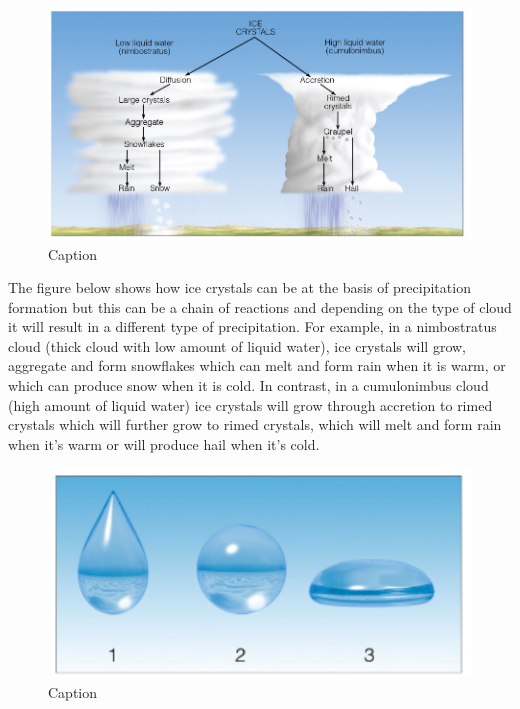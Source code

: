 \documentclass[12pt,oneside]{book}
\begin{document}
\begin{figure}

{\centering \includegraphics[width=0.9\linewidth]{figures/Figure334} 

}

\caption{Caption}\label{fig:Seeding}
\end{figure}

The figure below shows how ice crystals can be at the basis of
precipitation formation but this can be a chain of reactions and
depending on the type of cloud it will result in a different type of
precipitation. For example, in a nimbostratus cloud (thick cloud with
low amount of liquid water), ice crystals will grow, aggregate and form
snowflakes which can melt and form rain when it is warm, or which can
produce snow when it is cold. In contrast, in a cumulonimbus cloud (high
amount of liquid water) ice crystals will grow through accretion to
rimed crystals which will further grow to rimed crystals, which will
melt and form rain when it's warm or will produce hail when it's cold.

\begin{figure}

{\centering \includegraphics[width=0.9\linewidth]{figures/Figure335} 

}

\caption{Caption}\label{fig:Seeding2}
\end{figure}
\end{document}
